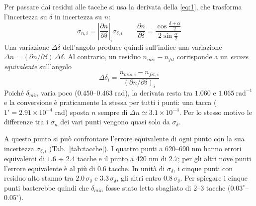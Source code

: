 \documentclass[10pt,twocolumn]{article}
\begin{document}
   \noindent Per passare dai residui alle tacche si usa la derivata della \eqref{eq:1}, che trasforma l'incertezza su $\delta$ in incertezza su $n$:
    \begin{equation}
      \sigma_{n,i}=\left|\frac{\partial n}{\partial\delta}\right|_i\sigma_{\delta,i}
      \qquad
      \frac{\partial n}{\partial \delta}=\frac{\cos\frac{\delta+\alpha}{2}}{2\sin\frac{\alpha}{2}}
      \label{eq:sigman}
    \end{equation}
   \noindent Una variazione $\Delta\delta$ dell'angolo produce quindi sull'indice una variazione $\Delta n=(\partial n/\partial\delta)\,\Delta\delta$. Al contrario, un residuo $n_{mis}-n_{fit}$ corrisponde a un \emph{errore equivalente} sull'angolo
    \begin{equation}
      \Delta\delta_i=\frac{n_{mis,i}-n_{fit,i}}{(\partial n/\partial\delta)_i}
      \label{eq:5}
    \end{equation}
   \noindent Poiché $\delta_{min}$ varia poco ($0.450$--$0.463$ rad), la derivata resta tra $1.060$ e $1.065\ \mathrm{rad}^{-1}$ e la conversione è praticamente la stessa per tutti i punti: una tacca ($1'=2.91\times10^{-4}$ rad) sposta $n$ sempre di $\Delta n\simeq3.1\times10^{-4}$. Per lo stesso motivo le differenze tra i $\sigma_n$ dei vari punti vengono quasi solo da $\sigma_\delta$.

   \noindent A questo punto si può confrontare l'errore equivalente di ogni punto con la sua incertezza $\sigma_{\delta,i}$ (Tab.~\ref{tab:tacche}). I quattro punti a 620--690 nm hanno errori equivalenti di $1.6$ ÷ $2.4$ tacche e il punto a 420 nm di $2.7$; per gli altri nove punti l'errore equivalente è al più di $0.6$ tacche. In unità di $\sigma_\delta$, i cinque punti con residuo alto stanno tra $2.0\,\sigma_\delta$ e $3.3\,\sigma_\delta$, gli altri entro $0.8\,\sigma_\delta$. Per spiegare i cinque punti basterebbe quindi che $\delta_{min}$ fosse stato letto sbagliato di 2--3 tacche ($0.03^\circ$--$0.05^\circ$).
\end{document}
